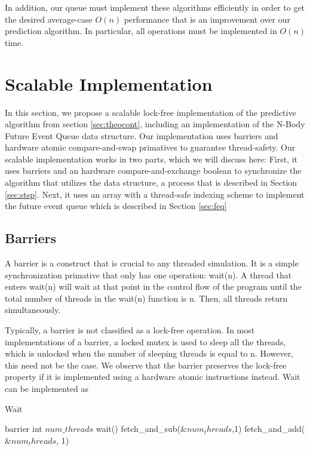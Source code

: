 \documentclass[conference]{IEEEtran}
\begin{document}
In addition, our queue must implement these algorithms efficiently in order to get the desired average-case $O(n)$ performance that is an improvement over our prediction algorithm.  In particular, all operations must be implemented in $O(n)$ time.

\section{Scalable Implementation}
In this section, we propose a scalable lock-free implementation of the predictive algorithm from section \ref{sec:theocont}, including an implementation of the 
N-Body Future Event Queue data structure.  Our implementation uses barriers and hardware atomic compare-and-swap primatives to guarantee thread-safety.  Our scalable implementation
works in two parts, which we will discuss here:  First, it uses barriers and an hardware compare-and-exchange boolean to synchronize the algorithm that utilizes the data structure, 
a process that is described in Section \ref{sec:stsp}.  Next, it uses an array with a thread-safe indexing scheme to implement the future event queue which is described in Section \ref{sec:feq}
\subsection{Barriers}
\label{sec:barrier}
A barrier is a construct that is crucial to any threaded simulation.  It is a simple synchronization primative that only has one operation: wait(n).  
A thread that enters wait(n) will wait at that point in the control flow of the program until the total number of threads in the wait(n) function is n.  Then,
all threads return simultaneously.

Typically, a barrier is not classified as a lock-free operation.  In most implementations of a barrier, a locked mutex is used to sleep all the threads, which is 
unlocked when the number of sleeping threads is equal to n.  However, this need not be the case.  We observe that the barrier preserves the lock-free property if it is implemented
using a hardware atomic instructions instead.  Wait can be implemented as 

\begin{algorithm}
\label{barrier}
\caption{Wait}
\begin{algorithmic}
\STATE barrier
	\STATE int $num\_threads$ 
	\STATE wait()
	\STATE {}
	\STATE fetch\_and\_sub($\&num_threads$,1)
	\STATE {}
		\STATE {}
		\STATE fetch\_and\_add($\&num_threads$, 1)
	\ENDWHILE
\end{algorithmic}
\end{algorithm}
\end{document}
